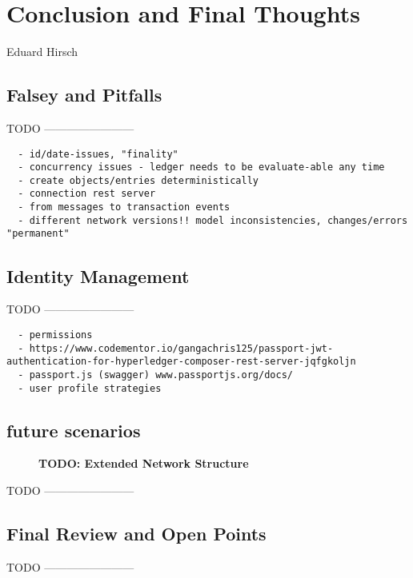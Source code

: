 \chapter{Conclusion and Final Thoughts}
\label{ch:conclusion}

\vspace{-1cm}
\begin{center}
Eduard Hirsch
\end{center}

\section{Falsey and Pitfalls}

TODO ------------------------

\begin{verbatim}
  - id/date-issues, "finality"
  - concurrency issues - ledger needs to be evaluate-able any time
  - create objects/entries deterministically
  - connection rest server
  - from messages to transaction events
  - different network versions!! model inconsistencies, changes/errors "permanent"
\end{verbatim}

\section{Identity Management}
\label{sec:id-management}

TODO ------------------------

\begin{verbatim}
  - permissions
  - https://www.codementor.io/gangachris125/passport-jwt-authentication-for-hyperledger-composer-rest-server-jqfgkoljn
  - passport.js (swagger) www.passportjs.org/docs/
  - user profile strategies
\end{verbatim}

\section{future scenarios}
\label{sec:future-scene}

\begin{figure}[htbp]
  \centering
  \caption{\bf\small TODO: Extended Network Structure}
  \label{fig:prototype-net-ext}
\end{figure}

TODO ------------------------

\section{Final Review and Open Points}

TODO ------------------------